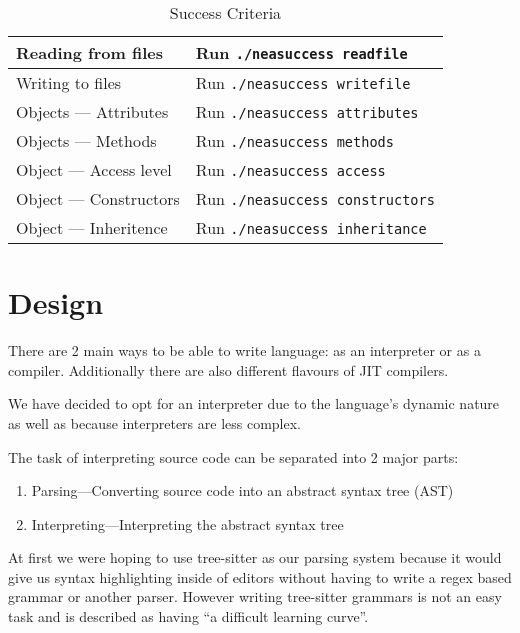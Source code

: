 \documentclass{article}
\begin{document}
\begin{table}
\begin{adjustbox}{center}
\begin{tabular}{|l|l|}
            \hline
            Reading from files & Run \texttt{./neasuccess readfile} \\
            \hline
            Writing to files & Run \texttt{./neasuccess writefile} \\
            \hline
            Objects --- Attributes & Run \texttt{./neasuccess attributes} \\
            \hline
            Objects --- Methods & Run \texttt{./neasuccess methods} \\
            \hline
            Object --- Access level & Run \texttt{./neasuccess access} \\
            \hline
            Object --- Constructors & Run \texttt{./neasuccess constructors} \\
            \hline
            Object --- Inheritence & Run \texttt{./neasuccess inheritance} \\
            \hline
        \end{tabular}
    \end{adjustbox}
    \caption{Success Criteria}
\end{table}

\section{Design}

There are 2 main ways to be able to write language: as an interpreter or as a
compiler. Additionally there are also different flavours of JIT compilers.

We have decided to opt for an interpreter due to the language's dynamic nature
as well as because interpreters are less complex.

The task of interpreting source code can be separated into 2 major parts:

\begin{enumerate}
    \item{Parsing---Converting source code into an abstract syntax tree (AST)}
    \item{Interpreting---Interpreting the abstract syntax tree}
\end{enumerate}

At first we were hoping to use tree-sitter as our parsing system because it
would give us syntax highlighting inside of editors without having to write a
regex based grammar or another parser. However writing tree-sitter grammars is
not an easy task and is described as having ``a difficult learning
curve''\cite{ts_creating_parsers}.
\end{document}
